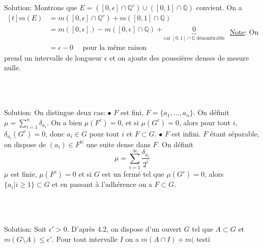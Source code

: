 \documentclass{report}
\begin{document}
Solution: Montrons que $E=\left([0,\epsilon] \cap \mathbb Q^c \right) \cup \left( [0,1] \cap \mathbb Q\right)$ convient. \newline
On a $\begin{aligned}[t] m(E) &= m([0,\epsilon] \cap \mathbb Q^c ) + m([0,1] \cap \mathbb Q) \\ &= m([0,\epsilon]) - m([0,\epsilon] \cap \mathbb Q) + \underbrace{0}_{\text{car $[0,1] \cap \mathbb Q$  dénombrable}} \\ &= \epsilon - 0 \quad \text{ pour la même raison}   \end{aligned}$
\newline \newline
\underline{Note}: On prend un intervalle de longueur $\epsilon$ et on ajoute des poussières denses de mesure nulle.

\subsection{} \\\\

Solution: On distingue deux cas: \newline
$\bullet$ $F$ est fini, $F=\{a_1, \ldots, a_n\}$. On définit $\mu = \sum_{i=1}^n \delta_{a_i}$. On a bien $\mu(F^c)=0$, et si $\mu(G^c)=0$, alors pour tout $i$, $\delta_{a_i}(G^c)=0$, donc $a_i\in G$ pour tout $i$ et $F\subset G$. \newline
$\bullet$ $F$ est infini. $F$ étant séparable, on dispose de $(a_i)\in F^{\mathbb N}$ une suite dense dans $F$. On définit $$\mu = \sum_{i=1}^\infty \frac{\delta_{a_i}}{2^i} $$ \newline
$\mu$ est finie, $\mu(F^c)=0$ et si $G$ est un fermé tel que $\mu(G^c)=0$, alors $\{a_i | i\geq 1\} \subset G$ et en passant à l'adhérence on a $F\subset G$.



\subsection{} 

\subsection{} \\ \\

Solution: Soit $\epsilon' >0$. D'après 4.2, on dispose d'un ouvert $G$ tel que $A\subset G$ et $m(G\setminus A)\leq \epsilon'$. Pour tout intervalle $I$ on a $m(A\cap I) + m($ testi
\end{document}
